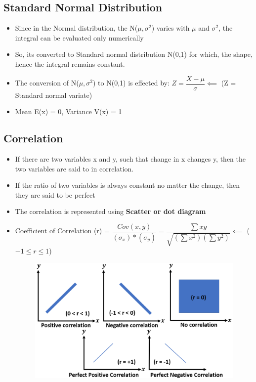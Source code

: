 \documentclass[8pt]{report}
\begin{document}
		\subsection{Standard Normal Distribution}
			\begin{itemize}
				\item Since in the Normal distribution, the N($\mu,\sigma^2$) varies with $\mu$ and $\sigma^2$, the integral can be evaluated only numerically
				\item So, its converted to Standard normal distribution N(0,1) for which, the shape, hence the integral remains constant. 
				\item The conversion of N($\mu,\sigma^2$) to N(0,1) is effected by: $\boxed{Z = \dfrac{X-\mu}{\sigma}}\impliedby$ (Z = Standard normal variate)
				\item Mean E(x) = 0, Variance V(x) = 1
			\end{itemize}\hrulefill
		\subsection{Correlation}
			\begin{itemize}
				\item If there are two variables x and y, such that change in x changes y, then the two variables are said to in correlation. 
				\item If the ratio of two variables is always constant no matter the change, then they are said to be perfect
				\item The correlation is represented using \textbf{Scatter or dot diagram}
				\item Coefficient of Correlation (r) = $\boxed{\dfrac{Cov(x,y)}{(\sigma_x)*(\sigma_y)} = \dfrac{\sum xy}{\sqrt{(\sum x^2)(\sum y^2)}}}\impliedby$ ($-1\le r \le 1$)
				\begin{figure}[H]
					\centering
					\includegraphics[scale=0.4]{correlation.png}
				\end{figure}
			\end{itemize}\hrulefill
\end{document}
